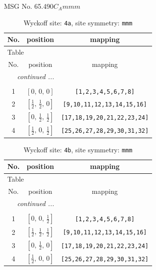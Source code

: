 \documentclass[fleqn,8pt]{jsarticle}
\begin{document}
\setcounter{MaxMatrixCols}{32}

\renewcommand{\tablename}{Table~}
\renewcommand{\figurename}{Figure~}
\begin{center}
\LARGE
MSG No. 65.490\quad$C_{A}mmm$
\end{center}
\renewcommand{\arraystretch}{1.2}
\begin{longtable}{ccc}
\caption{Wyckoff site: {\tt 4a}, site symmetry: {\tt mmm}}
 \\
 \hline \hline
No. & position & mapping \\ \hline \endfirsthead

\multicolumn{2}{l}{\tablename\ \thetable{}} \\
 \hline \hline
No. & position & mapping \\ \hline \endhead

 \hline \hline
\multicolumn{2}{r}{\footnotesize\it continued ...} \\ \endfoot

 \hline \hline
\multicolumn{2}{r}{} \\ \endlastfoot

1 & $\left[ 0,\, 0,\, 0 \right]$ & {\tt [1,2,3,4,5,6,7,8]} \\ \hline
2 & $\left[ \frac{1}{2},\, \frac{1}{2},\, 0 \right]$ & {\tt [9,10,11,12,13,14,15,16]} \\ \hline
3 & $\left[ 0,\, \frac{1}{2},\, \frac{1}{2} \right]$ & {\tt [17,18,19,20,21,22,23,24]} \\ \hline
4 & $\left[ \frac{1}{2},\, 0,\, \frac{1}{2} \right]$ & {\tt [25,26,27,28,29,30,31,32]} \\
\end{longtable}
\renewcommand{\arraystretch}{1.2}
\begin{longtable}{ccc}
\caption{Wyckoff site: {\tt 4b}, site symmetry: {\tt mmm}}
 \\
 \hline \hline
No. & position & mapping \\ \hline \endfirsthead

\multicolumn{2}{l}{\tablename\ \thetable{}} \\
 \hline \hline
No. & position & mapping \\ \hline \endhead

 \hline \hline
\multicolumn{2}{r}{\footnotesize\it continued ...} \\ \endfoot

 \hline \hline
\multicolumn{2}{r}{} \\ \endlastfoot

1 & $\left[ 0,\, 0,\, \frac{1}{2} \right]$ & {\tt [1,2,3,4,5,6,7,8]} \\ \hline
2 & $\left[ \frac{1}{2},\, \frac{1}{2},\, \frac{1}{2} \right]$ & {\tt [9,10,11,12,13,14,15,16]} \\ \hline
3 & $\left[ 0,\, \frac{1}{2},\, 0 \right]$ & {\tt [17,18,19,20,21,22,23,24]} \\ \hline
4 & $\left[ \frac{1}{2},\, 0,\, 0 \right]$ & {\tt [25,26,27,28,29,30,31,32]} \\
\end{longtable}
\end{document}
